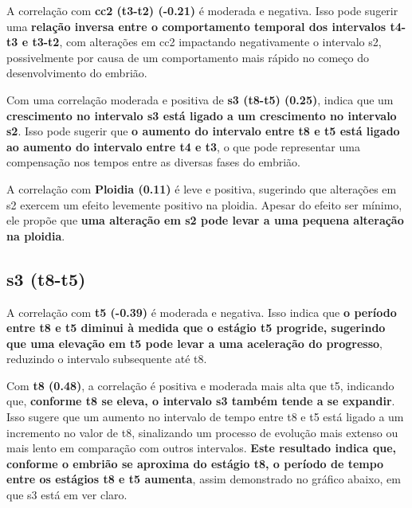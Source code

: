 A correlação com \textbf{cc2 (t3-t2) (-0.21)} é moderada e negativa. Isso pode sugerir uma \textbf{relação inversa entre o comportamento temporal dos intervalos t4-t3 e t3-t2}, com alterações em cc2 impactando negativamente o intervalo s2, possivelmente por causa de um comportamento mais rápido no começo do desenvolvimento do embrião.

Com uma correlação moderada e positiva de \textbf{s3 (t8-t5) (0.25)}, indica que um \textbf{crescimento no intervalo s3 está ligado a um crescimento no intervalo s2}. Isso pode sugerir que \textbf{o aumento do intervalo entre t8 e t5 está ligado ao aumento do intervalo entre t4 e t3}, o que pode representar uma compensação nos tempos entre as diversas fases do embrião.

A correlação com \textbf{Ploidia (0.11)} é leve e positiva, sugerindo que alterações em s2 exercem um efeito levemente positivo na ploidia. Apesar do efeito ser mínimo, ele propõe que \textbf{uma alteração em s2 pode levar a uma pequena alteração na ploidia}.

\subsection*{s3 (t8-t5)}
A correlação com \textbf{t5 (-0.39)} é moderada e negativa. Isso indica que \textbf{o período entre t8 e t5 diminui à medida que o estágio t5 progride, sugerindo que uma elevação em t5 pode levar a uma aceleração do progresso}, reduzindo o intervalo subsequente até t8. 

Com \textbf{t8 (0.48)}, a correlação é positiva e moderada mais alta que t5, indicando que, \textbf{conforme t8 se eleva, o intervalo s3 também tende a se expandir}. Isso sugere que um aumento no intervalo de tempo entre t8 e t5 está ligado a um incremento no valor de t8, sinalizando um processo de evolução mais extenso ou mais lento em comparação com outros intervalos. \textbf{Este resultado indica que, conforme o embrião se aproxima do estágio t8, o período de tempo entre os estágios t8 e t5 aumenta}, assim demonstrado no gráfico abaixo, em que s3 está em ver claro. 

